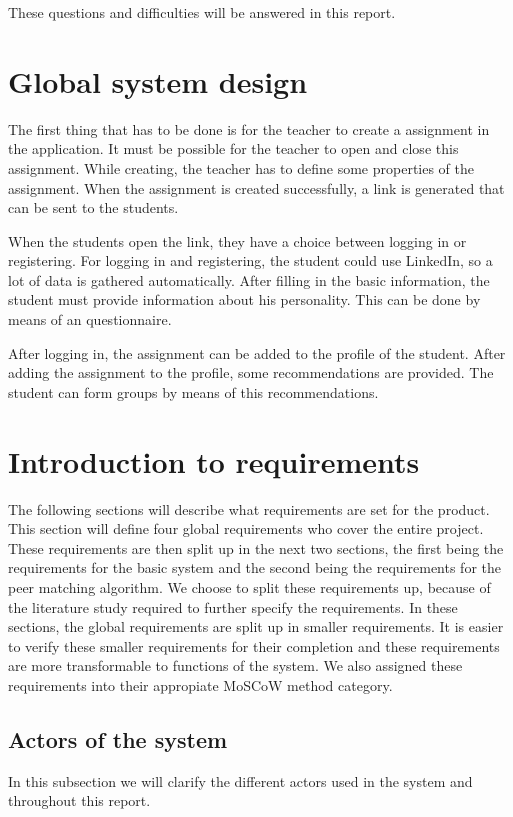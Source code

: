 \documentclass[]{article}
\begin{document}
These questions and difficulties will be answered in this report.

\section{Global system design}
The first thing that has to be done is for the teacher to create a assignment in the application.
It must be possible for the teacher to open and close this assignment. 
While creating, the teacher has to define some properties of the assignment.
When the assignment is created successfully, a link is generated that can be sent to the students.

When the students open the link, they have a choice between logging in or registering.
For logging in and registering, the student could use LinkedIn, so a lot of data is gathered automatically.
After filling in the basic information, the student must provide information about his personality.
This can be done by means of an questionnaire.

After logging in, the assignment can be added to the profile of the student.
After adding the assignment to the profile, some recommendations are provided.
The student can form groups by means of this recommendations.

\section{Introduction to requirements}
The following sections will describe what requirements are set for the product.
This section will define four global requirements who cover the entire project.
These requirements are then split up in the next two sections, the first being the requirements for the basic system and the second being the requirements for the peer matching algorithm.
We choose to split these requirements up, because of the literature study required to further specify the requirements.
In these sections, the global requirements are split up in smaller requirements.
It is easier to verify these smaller requirements for their completion and these requirements are more transformable to functions of the system.
We also assigned these requirements into their appropiate MoSCoW \cite{highsmith2001agile} method category.

\subsection{Actors of the system}
In this subsection we will clarify the different actors used in the system and throughout this report.
\end{document}
